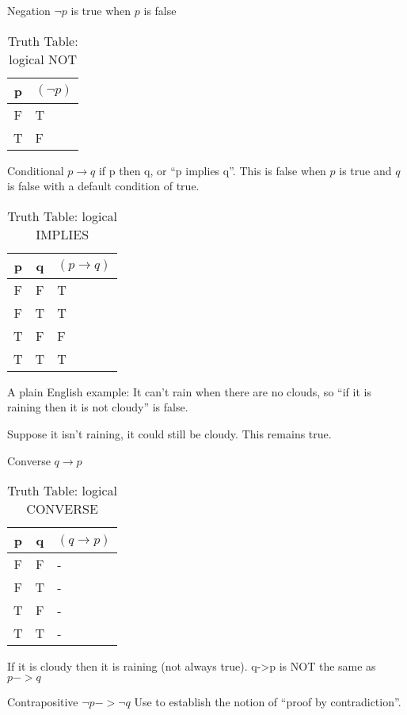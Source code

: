 Negation $\lnot p$ is true when $p$ is false
\begin{table}[!htb]
\label{tab:TruthTableNOT}
\begin{tabularx}{\linewidth}{| c | X |} \hline
  p & $(\lnot p)$ \\ \hline \hline
  F & T \\ \hline
  T & F\\ \hline
\end{tabularx}
\caption{Truth Table: logical NOT}
\end{table}

Conditional $p \to q$ if p then q, or ``p implies q''. This is false when
$p$ is true and $q$ is false with a default condition of true.

\begin{table}[!htb]
\label{tab:TruthTableIMPLIES}
\begin{tabularx}{\linewidth}{| c | c | X |} \hline
  p & q & $(p \to q)$ \\ \hline \hline
  F & F & T \\ \hline
  F & T & T \\ \hline
  T & F & F \\ \hline
  T & T & T \\ \hline
\end{tabularx}
\caption{Truth Table: logical IMPLIES}
\end{table}

A plain English example: It can't rain when there are no clouds, so ``if it is
raining then it is not cloudy'' is false.

Suppose it isn't raining, it could still be cloudy. This remains true.

Converse $q \to p$
\begin{table}[!htb]
\label{tab:TruthTableCONVERSE}
\begin{tabularx}{\linewidth}{| c | c | X |} \hline
  p & q & $(q \to p)$ \\ \hline \hline
  F & F & - \\ \hline
  F & T & - \\ \hline
  T & F & - \\ \hline
  T & T & - \\ \hline
\end{tabularx}
\caption{Truth Table: logical CONVERSE}
\end{table}

If it is cloudy then it is raining (not always true).
q->p is NOT the same as $p -> q$

Contrapositive $\lnot p -> \lnot q$
Use to establish the notion of ``proof by contradiction''.

